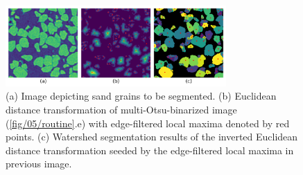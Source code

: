\begin{figure}[ht]
    \centering
    \includegraphics[width=0.75\textwidth]{figures/05/06-overseg.png}
    \caption{
        \small{}
        (a) Image depicting sand grains to be segmented.
        (b) Euclidean distance transformation of multi-Otsu-binarized image
        (\ref{fig/05/routine}.e) with edge-filtered local maxima denoted
        by red points.
        (c) Watershed segmentation results of the inverted Euclidean distance
        transformation seeded by the edge-filtered local maxima in previous
        image.
    }
    \label{fig/05/overseg}
\end{figure}

